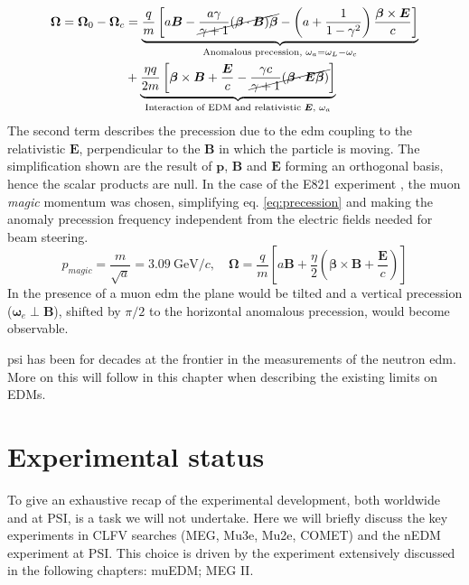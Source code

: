 \begin{refsection}
    \begin{equation}
        \begin{split}
            \bm{\Omega}=\bm{\Omega}_0-\bm{\Omega}_c &=
            \underbrace{ 
                \frac{q}{m}\left[ a\bm{B} -\cancel{\frac{a\gamma}{\gamma+1}(\bm{\beta}\cdot \bm{B})\bm{\beta}} - \left(  a+\frac{1}{1-\gamma^2}\right)\frac{\bm{\beta} \times \bm{E}}{c} \right]
            }_{\text{Anomalous precession, } \omega_a=\omega_L-\omega_c} \\&+
            \underbrace{
                \frac{\eta q}{2m}\left[ \bm{\beta} \times \bm{B} + \frac{\bm{E}}{c}- \cancel{\frac{\gamma c}{\gamma+1}(\bm{\beta}\cdot\bm{E\beta})} \right]
            }_{\text{Interaction of EDM and relativistic $\bm{E}$, } \omega_a}
        \end{split}
        \label{eq:precession}
    \end{equation}
    The second term describes the precession due to the \gls{edm} coupling to the relativistic $\bm{E}$, perpendicular to the $\bm{B}$ in which the particle is moving. 
    The simplification shown are the result of $\bm{p}$, $\bm{B}$ and $\bm{E}$ forming an orthogonal basis, hence the scalar products are null.
    In the case of the E821 experiment \cite{muEDM:E821}, the muon \textit{magic} momentum was chosen, simplifying eq. \ref{eq:precession} and making the anomaly precession frequency independent from the electric fields needed for beam steering. 
    \begin{equation}
        p_{magic}=\frac{m}{\sqrt{a}}=3.09\ \text{GeV}/c, \quad
        \bm{\Omega} = \frac{q}{m} \left[ a\bm{B} +\frac{\eta}{2}\left( \bm{\beta}\times\bm{B} + \frac{\bm{E}}{c}\right) \right]
    \end{equation} 
    In the presence of a muon \gls{edm} the plane would be tilted and a vertical precession ($\bm{\omega}_e\perp\bm{B}$), shifted by $\pi/2$ to the horizontal anomalous precession, would become observable.

    \gls{psi} has been for decades at the frontier in the measurements of the neutron \gls{edm}.
    More on this will follow in this chapter when describing the existing limits on EDMs.\\
    \cite{edmasprobe}

\section{Experimental status}
    To give an exhaustive recap of the experimental development, both worldwide and at PSI, is a task we will not undertake. 
    Here we will briefly discuss the key experiments in CLFV searches (MEG, Mu3e, Mu2e, COMET) and the nEDM experiment at PSI.
    This choice is driven by the experiment extensively discussed in the following chapters: muEDM; MEG II.


\end{refsection}

